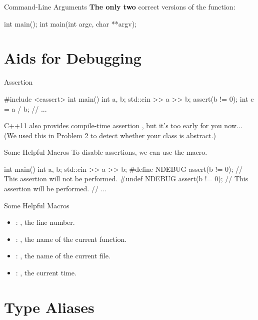 \documentclass{beamer}
\begin{document}
\begin{frame}[fragile]{Command-Line Arguments}
    \textbf{The only two} correct versions of the  function:
    \begin{cpp}
int main();
int main(int argc, char **argv);
    \end{cpp}
\end{frame}

\section{Aids for Debugging}

\begin{frame}[fragile]{Assertion}
    \begin{cpp}
#include <cassert>
int main() {
  int a, b;
  std::cin >> a >> b;
  assert(b != 0);
  int c = a / b;
  // ...
}
    \end{cpp}
    C++11 also provides compile-time assertion , but it's too early for you now... (We used this in Problem 2 to detect whether your  class is abstract.)
\end{frame}

\begin{frame}[fragile]{Some Helpful Macros}
    To disable assertions, we can use the  macro.
    \begin{cpp}
int main() {
  int a, b;
  std::cin >> a >> b;
#define NDEBUG
  assert(b != 0); // This assertion will not be performed.
#undef NDEBUG
  assert(b != 0); // This assertion will be performed.
  // ...
}
    \end{cpp}
\end{frame}

\begin{frame}[fragile]{Some Helpful Macros}
    \begin{itemize}
        \item {}: , the line number.
        \item {}: \const{}\ttt{[]}, the name of the current function.
        \item {}: \const{}\ttt{[]}, the name of the current file.
        \item {}: \const{}\ttt{[]}, the current time.
    \end{itemize}
\end{frame}

\section{Type Aliases}
\end{document}
